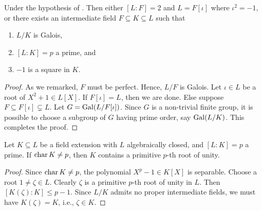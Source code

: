 \begin{lemma}
    Under the hypothesis of . Then either $[L : F] = 2$ and $L = F[\iota]$ where $\iota^2 = -1$, or there exists an intermediate field $F\subseteq K\subseteq L$ such that 
    \begin{enumerate}[label=(\roman*)]
        \item $L/K$ is Galois, 
        \item $[L : K] = p$ a prime, and 
        \item $-1$ is a square in $K$.
    \end{enumerate}
\end{lemma}
\begin{proof}
    As we remarked, $F$ must be perfect. Hence, $L/F$ is Galois. Let $\iota\in L$ be a root of $X^2 + 1\in L[X]$. If $F[\iota] = L$, then we are done. Else suppose $F\subseteq F[\iota]\subsetneq L$. Let $G = \operatorname{Gal}(L/F[\iota])$. Since $G$ is a non-trivial finite group, it is possible to choose a subgroup of $G$ having prime order, say $\operatorname{Gal}(L/K)$. This completes the proof.
\end{proof}


\begin{lemma}
    Let $K\subseteq L$ be a field extension with $L$ algebraically closed, and $[L : K] = p$ a prime. If $\operatorname{char} K\ne p$, then $K$ contains a primitive $p$-th root of unity.
\end{lemma}
\begin{proof}
    Since $\operatorname{char} K\ne p$, the polynomial $X^p - 1\in K[X]$ is separable. Choose a root $1\ne\zeta\in L$. Clearly $\zeta$ is a primitive $p$-th root of unity in $L$. Then $[K(\zeta) : K]\le p - 1$. Since $L/K$ admits no proper intermediate fields, we must have $K(\zeta) = K$, i.e., $\zeta\in K$.
\end{proof}

